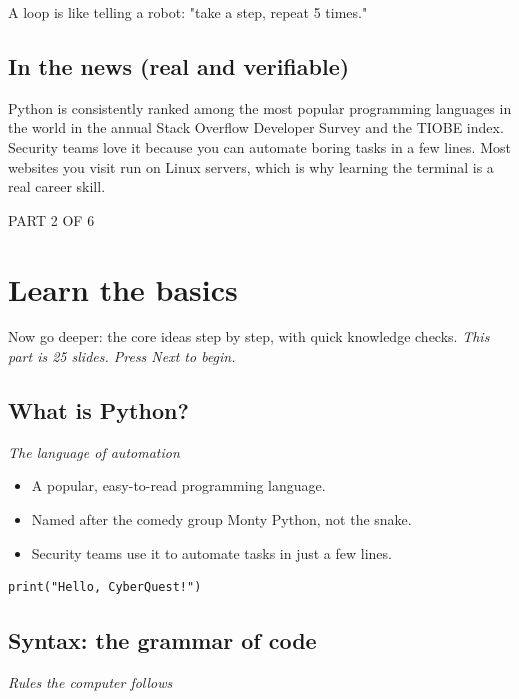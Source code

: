 \documentclass[12pt,openany]{book}
\begin{document}
A loop is like telling a robot: "take a step, repeat 5 times."

\medskip

\subsection*{In the news (real and verifiable)}


Python is consistently ranked among the most popular programming languages in the world in the annual Stack Overflow Developer Survey and the TIOBE index. Security teams love it because you can automate boring tasks in a few lines. Most websites you visit run on Linux servers, which is why learning the terminal is a real career skill.

\medskip

\vspace{4pt}\noindent\textsc{PART 2 OF 6}


\section*{Learn the basics}

Now go deeper: the core ideas step by step, with quick knowledge checks.
{\small\itshape\color{gray}This part is 25 slides. Press Next to begin.}

\medskip

\subsection*{What is Python?}
{\small\itshape\color{gray}The language of automation}


\begin{itemize}
  \item A popular, easy-to-read programming language.
  \item Named after the comedy group Monty Python, not the snake.
  \item Security teams use it to automate tasks in just a few lines.
\end{itemize}

\begin{lstlisting}
print("Hello, CyberQuest!")\end{lstlisting}

\medskip

\subsection*{Syntax: the grammar of code}
{\small\itshape\color{gray}Rules the computer follows}
\end{document}
